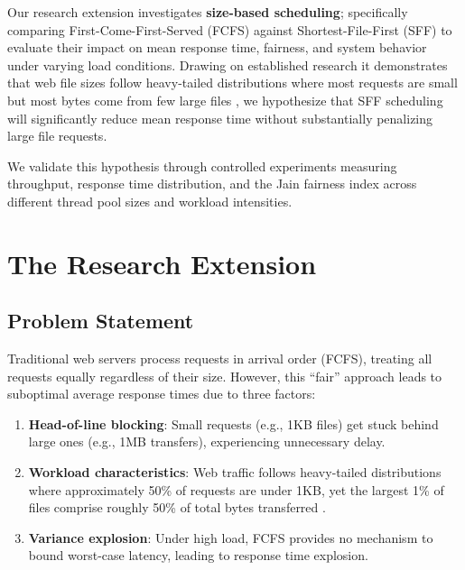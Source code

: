\documentclass[11pt,a4paper]{article}
\begin{document}
Our research extension investigates \textbf{size-based scheduling}; specifically comparing First-Come-First-Served (FCFS) against Shortest-File-First (SFF) to evaluate their impact on mean response time, fairness, and system behavior under varying load conditions. Drawing on established research it demonstrates that web file sizes follow heavy-tailed distributions where most requests are small but most bytes come from few large files \cite{harchol2003}, we hypothesize that SFF scheduling will significantly reduce mean response time without substantially penalizing large file requests. 

We validate this hypothesis through controlled experiments measuring throughput, response time distribution, and the Jain fairness index across different thread pool sizes and workload intensities.

\section{The Research Extension}

\subsection{Problem Statement}

Traditional web servers process requests in arrival order (FCFS), treating all requests equally regardless of their size. However, this ``fair'' approach leads to suboptimal average response times due to three factors:

\begin{enumerate}[leftmargin=*]
    \item \textbf{Head-of-line blocking}: Small requests (e.g., 1KB files) get stuck behind large ones (e.g., 1MB transfers), experiencing unnecessary delay.
    
    \item \textbf{Workload characteristics}: Web traffic follows heavy-tailed distributions where approximately 50\% of requests are under 1KB, yet the largest 1\% of files comprise roughly 50\% of total bytes transferred \cite{crovella1997}.
    
    \item \textbf{Variance explosion}: Under high load, FCFS provides no mechanism to bound worst-case latency, leading to response time explosion.
\end{enumerate}
\end{document}
